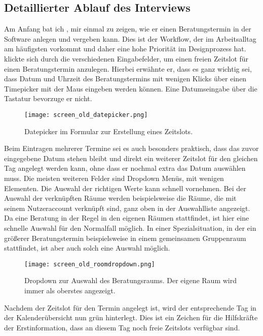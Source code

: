 \subsection*{Detaillierter Ablauf des Interviews}
Am Anfang bat ich \ipName, mir einmal zu zeigen, wie er einen Beratungstermin
in der Software anlegen und vergeben kann. Dies ist der Workflow, der im
Arbeitsalltag am häufigsten vorkommt und daher eine hohe Priorität im
Designprozess hat. \ipName klickte sich durch die verschiedenen Eingabefelder,
um einen freien Zeitslot für einen Beratungstermin anzulegen. Hierbei erwähnte
er, dass es ganz wichtig sei, dass Datum und Uhrzeit des Beratungstermins mit
wenigen Klicks über einen \gls{Timepicker} mit der Maus eingeben werden können.
Eine Datumseingabe über die Tastatur bevorzuge er nicht.

\begin{figure}[H]
    \caption{Datepicker im Formular zur Erstellung eines Zeitslots.}
    \centering
    \texttt{[image: screen\_old\_datepicker.png]}
\end{figure}

Beim Eintragen mehrerer Termine sei es auch besonders praktisch, dass das zuvor
eingegebene Datum stehen bleibt und direkt ein weiterer Zeitslot für den
gleichen Tag angelegt werden kann, ohne dass er nochmal extra das Datum
auswählen muss. Die meisten weiteren Felder sind Dropdown Menüs, mit wenigen
Elementen. Die Auswahl der richtigen Werte kann \ipName schnell vornehmen. Bei
der Auswahl der verknüpften Räume werden beispielsweise die Räume, die mit
seinem Nutzeraccount verknüpft sind, ganz oben in der Auswahlliste angezeigt.
Da eine Beratung in der Regel in den eigenen Räumen stattfindet, ist hier eine
schnelle Auswahl für den Normalfall möglich. In einer Spezialsituation, in der
ein größerer Beratungstermin beispielsweise in einem gemeinsamen Gruppenraum
stattfindet, ist aber auch solch eine Auswahl möglich.

\begin{figure}[H]
    \caption{Dropdown zur Auswahl des Beratungsraums. Der eigene Raum wird immer als oberstes angezeigt.}
    \centering
    \texttt{[image: screen\_old\_roomdropdown.png]}
\end{figure}

Nachdem der Zeitslot für den Termin angelegt ist, wird der entsprechende Tag in
der Kalenderübersicht nun grün hinterlegt. Dies ist ein Zeichen für die
Hilfskräfte der Erstinformation, dass an diesem Tag noch freie Zeitslots
verfügbar sind.

